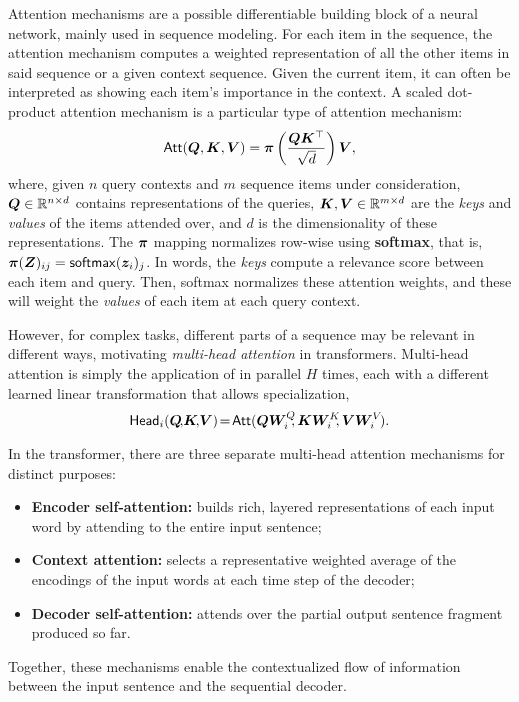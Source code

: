 \begin{definition}
    Attention mechanisms are a possible differentiable building block
    of a neural network, mainly used in sequence modeling. For each
    item in the sequence, the attention mechanism computes a weighted
    representation of all the other items in said sequence or a given
    context sequence. Given the current item, it can often be
    interpreted as showing each item's importance in the context. A
    scaled dot-product attention mechanism is a particular type of
    attention mechanism:
    \begin{equation}
        \operatorname{\mathsf{Att}}(\bm{Q}, \bm{K}, \bm{V}) = \bm{\pi}
        \left(\frac{\bm{Q}\bm{K}^\top}{\sqrt{d}}\right) \bm{V},
        \label{eq:att_scaled_dot}
    \end{equation}
    where, given $n$ query contexts and $m$ sequence items under
    consideration, $\bm{Q} \in \mathbb{R}^{n \times d}$ contains
    representations of the queries, $\bm{K}, \bm{V} \in \mathbb{R}^{m
            \times d}$ are the \emph{keys} and \emph{values} of the items
    attended over, and $d$ is the dimensionality of these
    representations. The $\bm{\pi}$ mapping normalizes row-wise using
    \textbf{softmax}, that is, $\bm{\pi}(\bm{Z})_{ij} = \operatorname*{\mathsf{softmax}}(\bm{z}_i)_j$.
    In words, the \emph{keys} compute a relevance score between each item
    and query. Then, softmax normalizes these attention weights, and
    these will weight the \emph{values} of each item at each query
    context.
\end{definition}

However, for complex tasks, different parts of a sequence may be
relevant in different ways, motivating \emph{multi-head attention} in
transformers. Multi-head attention is simply the application of
 in parallel $H$ times, each with a
different learned linear transformation that allows specialization,
%
\begin{equation}\label{eq:head}%
    \ath_i(\bm{Q}\!,\!\bm{K}\!,\!\bm{V})\!=\!\att(\bm{QW}_i^Q\!\!,\bm{KW}_i^K\!\!,\bm{VW}_i^V\!).
\end{equation}

In the transformer, there are three separate multi-head attention mechanisms for
distinct purposes:
%
\begin{itemize}
    \item \textbf{Encoder self-attention:} builds rich, layered representations of
          each input word by attending to the entire input sentence;
    \item \textbf{Context attention:} selects
          a representative weighted average of the encodings of the input words at each
          time step of the decoder;
    \item \textbf{Decoder self-attention:} attends over the partial output sentence
          fragment produced so far.
\end{itemize}
%
Together, these mechanisms enable the contextualized flow of information between
the input sentence and the sequential decoder.

